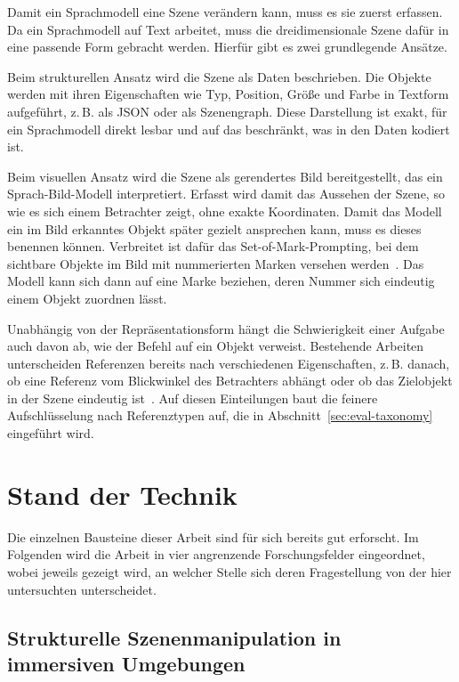 Damit ein Sprachmodell eine Szene verändern kann, muss es sie zuerst erfassen.
Da ein Sprachmodell auf Text arbeitet, muss die dreidimensionale Szene dafür in eine passende Form gebracht werden.
Hierfür gibt es zwei grundlegende Ansätze.

Beim strukturellen Ansatz wird die Szene als Daten beschrieben.
Die Objekte werden mit ihren Eigenschaften wie Typ, Position, Größe und Farbe in Textform aufgeführt, z.\,B. als JSON oder als Szenengraph.
Diese Darstellung ist exakt, für ein Sprachmodell direkt lesbar und auf das beschränkt, was in den Daten kodiert ist.

Beim visuellen Ansatz wird die Szene als gerendertes Bild bereitgestellt, das ein Sprach-Bild-Modell interpretiert.
Erfasst wird damit das Aussehen der Szene, so wie es sich einem Betrachter zeigt, ohne exakte Koordinaten.
Damit das Modell ein im Bild erkanntes Objekt später gezielt ansprechen kann, muss es dieses benennen können.
Verbreitet ist dafür das Set-of-Mark-Prompting, bei dem sichtbare Objekte im Bild mit nummerierten Marken versehen werden~\cite{yang2023}.
Das Modell kann sich dann auf eine Marke beziehen, deren Nummer sich eindeutig einem Objekt zuordnen lässt.

Unabhängig von der Repräsentationsform hängt die Schwierigkeit einer Aufgabe auch davon ab, wie der Befehl auf ein Objekt verweist.
Bestehende Arbeiten unterscheiden Referenzen bereits nach verschiedenen Eigenschaften, z.\,B. danach, ob eine Referenz vom Blickwinkel des Betrachters abhängt oder ob das Zielobjekt in der Szene eindeutig ist~\cite{achlioptas2020, chen2020}.
Auf diesen Einteilungen baut die feinere Aufschlüsselung nach Referenztypen auf, die in Abschnitt~\ref{sec:eval-taxonomy} eingeführt wird.


\section{Stand der Technik}
\label{sec:grundlagen-sota}

Die einzelnen Bausteine dieser Arbeit sind für sich bereits gut erforscht.
Im Folgenden wird die Arbeit in vier angrenzende Forschungsfelder eingeordnet, wobei jeweils gezeigt wird, an welcher Stelle sich deren Fragestellung von der hier untersuchten unterscheidet.

\subsection{Strukturelle Szenenmanipulation in immersiven Umgebungen}

